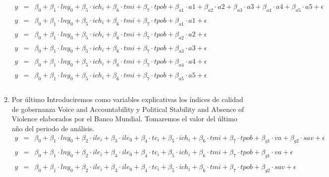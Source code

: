 \begin{enumerate}[\bfseries 1.]
	$$\begin{array}{rcl}
	    y&=&\beta_0 + \beta_1\cdot lny_0 + \beta_5\cdot ich_i + \beta_6\cdot tmi + \beta_7\cdot tpob + \beta_{a1}\cdot a1 + \beta_{a2}\cdot a2  + \beta_{a3}\cdot a3 + \beta_{a4}\cdot a4 + \beta_{a5}\cdot a5 + \epsilon\\\\
	    y&=&\beta_0 + \beta_1\cdot lny_0 + \beta_5\cdot ich_i + \beta_6\cdot tmi + \beta_7\cdot tpob + \beta_{a1}\cdot a1 + \epsilon\\\\
	    y&=&\beta_0 + \beta_1\cdot lny_0 + \beta_5\cdot ich_i + \beta_6\cdot tmi + \beta_7\cdot tpob + \beta_{a2}\cdot a2 + \epsilon\\\\
	    y&=&\beta_0 + \beta_1\cdot lny_0 + \beta_5\cdot ich_i + \beta_6\cdot tmi + \beta_7\cdot tpob  + \beta_{a3}\cdot a3 + \epsilon\\\\
	    y&=&\beta_0 + \beta_1\cdot lny_0 + \beta_5\cdot ich_i + \beta_6\cdot tmi + \beta_7\cdot tpob + \beta_{a4}\cdot a4 + \epsilon\\\\
	    y&=&\beta_0 + \beta_1\cdot lny_0 + \beta_5\cdot ich_i + \beta_6\cdot tmi + \beta_7\cdot tpob + \beta_{a5}\cdot a5 + \epsilon\\\\
	\end{array}$$

    \item Por último Introduciremos como variables explicativas los índices de calidad de gobernanza Voice and Accountability y Political Stability and Absence of Violence elaborados por el Banco Mundial. Tomaremos el valor del último año del periodo de análisis.
	$$\begin{array}{rcl}
	    y&=&\beta_0 + \beta_1\cdot lny_0 + \beta_2\cdot ile_i + \beta_3\cdot ile_0 + \beta_4\cdot tc_i + \beta_5\cdot ich_i + \beta_6\cdot tmi + \beta_7\cdot tpob + \beta_{g1}\cdot va + \beta_{g2}\cdot sav + \epsilon\\\\
	    y&=&\beta_0 + \beta_1\cdot lny_0 + \beta_2\cdot ile_i + \beta_3\cdot ile_0 + \beta_4\cdot tc_i + \beta_5\cdot ich_i + \beta_6\cdot tmi + \beta_7\cdot tpob + \beta_{g1}\cdot va + \epsilon\\\\
	    y&=&\beta_0 + \beta_1\cdot lny_0 + \beta_2\cdot ile_i + \beta_3\cdot ile_0 + \beta_4\cdot tc_i + \beta_5\cdot ich_i + \beta_6\cdot tmi + \beta_7\cdot tpob + \beta_{g2}\cdot sav + \epsilon\\\\
	\end{array}$$

\end{enumerate}

